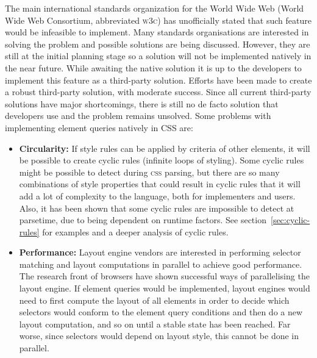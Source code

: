 \documentclass[a4paper,11pt]{kth-mag}
\begin{document}
      The main international standards organization for the World Wide Web (World Wide Web Consortium, abbreviated \textsc{w3c}) has unofficially stated that such feature would be infeasible to implement.
      Many standards organisations are interested in solving the problem and possible solutions are being discussed. 
      However, they are still at the initial planning stage so a solution will not be implemented natively in the near future.
      While awaiting the native solution it is up to the developers to implement this feature as a third-party solution.
      Efforts have been made to create a robust third-party solution, with moderate success.
      Since all current third-party solutions have major shortcomings, there is still no de facto solution that developers use and the problem remains unsolved.
      Some problems with implementing element queries natively in CSS are:
      \begin{itemize}
        \item \textbf{Circularity:}
        If style rules can be applied by criteria of other elements, it will be possible to create cyclic rules (infinite loops of styling).
        Some cyclic rules might be possible to detect during \textsc{css} parsing, but there are so many combinations of style properties that could result in cyclic rules that it will add a lot of complexity to the language, both for implementers and users.
        Also, it has been shown that some cyclic rules are impossible to detect at parsetime, due to being dependent on runtime factors.
        See section~\ref{sec:cyclic-rules} for examples and a deeper analysis of cyclic rules.
        \item \textbf{Performance:} 
        Layout engine vendors are interested in performing selector matching and layout computations in parallel to achieve good performance.
        The research front of browsers have shown successful ways of parallelising the layout engine.
        If element queries would be implemented, layout engines would need to first compute the layout of all elements in order to decide which selectors would conform to the element query conditions and then do a new layout computation, and so on until a stable state has been reached.
        Far worse, since selectors would depend on layout style, this cannot be done in parallel.
      \end{itemize}
\end{document}
